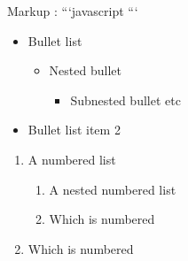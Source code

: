 \documentclass[letterpaper,10pt,english]{sphinxmanual}
\begin{document}
\begin{sphinxVerbatim}[commandchars=\\\{\}]
Markup : ```javascript
         ```
\end{sphinxVerbatim}
\begin{itemize}
\item {} 
\sphinxAtStartPar
Bullet list
\begin{itemize}
\item {} 
\sphinxAtStartPar
Nested bullet
\begin{itemize}
\item {} 
\sphinxAtStartPar
Sub\sphinxhyphen{}nested bullet etc

\end{itemize}

\end{itemize}

\item {} 
\sphinxAtStartPar
Bullet list item 2

\end{itemize}

\begin{sphinxVerbatim}[commandchars=\\\{\}]
     
                
                     
              
\end{sphinxVerbatim}
\begin{enumerate}
%
\item {} 
\sphinxAtStartPar
A numbered list
\begin{enumerate}
%
\item {} 
\sphinxAtStartPar
A nested numbered list

\item {} 
\sphinxAtStartPar
Which is numbered

\end{enumerate}

\item {} 
\sphinxAtStartPar
Which is numbered

\end{enumerate}
\end{document}
